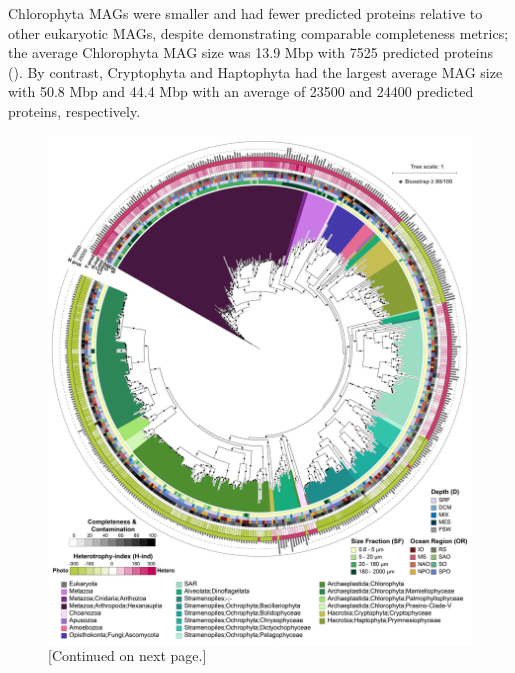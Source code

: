 \documentclass[12pt]{article}
\numberwithin{equation}{section}
\begin{document}
Chlorophyta MAGs were smaller and had fewer predicted proteins relative to other eukaryotic MAGs, despite demonstrating comparable completeness metrics; the average Chlorophyta MAG size was 13.9 Mbp with 7525 predicted proteins (). By contrast, Cryptophyta and Haptophyta had the largest average MAG size with 50.8 Mbp and 44.4 Mbp with an average of 23500 and 24400 predicted proteins, respectively.

\begin{figure}[h!]    
    \centering
    \includegraphics[width = \columnwidth]{figures/Figure3_EukPhylogeny_30Busco-v2-01.png}
    \caption{[Continued on next page.]}
    \label{fig:fig3-euk}
\end{figure}
\end{document}
